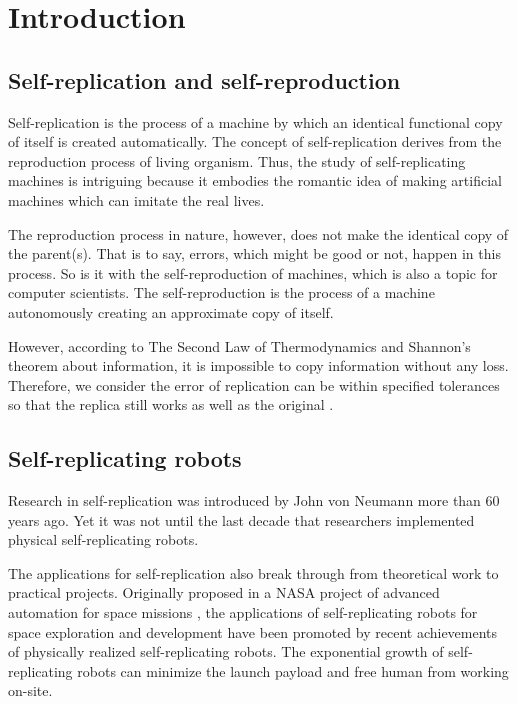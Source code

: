 \documentclass[12pt,twoside]{article}
\theoremstyle{plain}
\theoremstyle{definition}
\theoremstyle{remark}
\begin{document}
\tableofcontents
{}
\clearpage



\section{Introduction}
\label{sec:intro}

\subsection{Self-replication and self-reproduction}
Self-replication is the process of a machine by which an identical functional copy of itself is created automatically. The concept of self-replication derives from the reproduction process of living organism. Thus, the study of self-replicating machines is intriguing because it embodies the romantic idea of making artificial machines which can imitate the real lives.

The reproduction process in nature, however, does not make the identical copy of the parent(s). That is to say, errors, which might be good or not, happen in this process.  So is it with the self-reproduction of machines, which is also a topic for computer scientists. The self-reproduction is the process of a machine autonomously creating an approximate copy of itself.

However, according to The Second Law of Thermodynamics and Shannon's theorem about information, it is impossible to copy information without any loss. Therefore, we consider the error of replication can be within specified tolerances so that the replica still
works as well as the original \cite{jones_reprap_2011}.

\subsection{Self-replicating robots}
Research in self-replication was introduced by John von Neumann\cite{von_neumann_theory_1962} more than 60 years ago. Yet it was not until the last decade that researchers implemented physical self-replicating robots\cite{suthakorn_autonomous_2003}. 

The applications for self-replication also break through from theoretical work to practical projects. Originally proposed in a NASA project of advanced automation for space missions \cite{freitas_report_1981}, the applications of self-replicating robots for space exploration and development have been promoted by recent achievements of physically realized self-replicating robots\cite{chirikjian_self-replicating_2002}. The exponential growth of self-replicating robots can minimize the launch payload and free human from working on-site.
\end{document}
